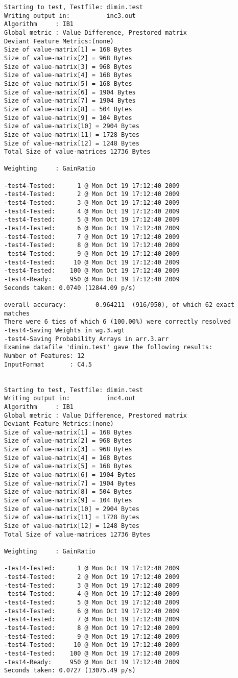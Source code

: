 \documentclass{report}
\begin{document}
\begin{footnotesize}
\begin{verbatim}
Starting to test, Testfile: dimin.test
Writing output in:          inc3.out
Algorithm     : IB1
Global metric : Value Difference, Prestored matrix
Deviant Feature Metrics:(none)
Size of value-matrix[1] = 168 Bytes 
Size of value-matrix[2] = 968 Bytes 
Size of value-matrix[3] = 968 Bytes 
Size of value-matrix[4] = 168 Bytes 
Size of value-matrix[5] = 168 Bytes 
Size of value-matrix[6] = 1904 Bytes 
Size of value-matrix[7] = 1904 Bytes 
Size of value-matrix[8] = 504 Bytes 
Size of value-matrix[9] = 104 Bytes 
Size of value-matrix[10] = 2904 Bytes 
Size of value-matrix[11] = 1728 Bytes 
Size of value-matrix[12] = 1248 Bytes 
Total Size of value-matrices 12736 Bytes 

Weighting     : GainRatio

-test4-Tested:      1 @ Mon Oct 19 17:12:40 2009
-test4-Tested:      2 @ Mon Oct 19 17:12:40 2009
-test4-Tested:      3 @ Mon Oct 19 17:12:40 2009
-test4-Tested:      4 @ Mon Oct 19 17:12:40 2009
-test4-Tested:      5 @ Mon Oct 19 17:12:40 2009
-test4-Tested:      6 @ Mon Oct 19 17:12:40 2009
-test4-Tested:      7 @ Mon Oct 19 17:12:40 2009
-test4-Tested:      8 @ Mon Oct 19 17:12:40 2009
-test4-Tested:      9 @ Mon Oct 19 17:12:40 2009
-test4-Tested:     10 @ Mon Oct 19 17:12:40 2009
-test4-Tested:    100 @ Mon Oct 19 17:12:40 2009
-test4-Ready:     950 @ Mon Oct 19 17:12:40 2009
Seconds taken: 0.0740 (12844.09 p/s)

overall accuracy:        0.964211  (916/950), of which 62 exact matches 
There were 6 ties of which 6 (100.00%) were correctly resolved
-test4-Saving Weights in wg.3.wgt
-test4-Saving Probability Arrays in arr.3.arr
Examine datafile 'dimin.test' gave the following results:
Number of Features: 12
InputFormat       : C4.5


Starting to test, Testfile: dimin.test
Writing output in:          inc4.out
Algorithm     : IB1
Global metric : Value Difference, Prestored matrix
Deviant Feature Metrics:(none)
Size of value-matrix[1] = 168 Bytes 
Size of value-matrix[2] = 968 Bytes 
Size of value-matrix[3] = 968 Bytes 
Size of value-matrix[4] = 168 Bytes 
Size of value-matrix[5] = 168 Bytes 
Size of value-matrix[6] = 1904 Bytes 
Size of value-matrix[7] = 1904 Bytes 
Size of value-matrix[8] = 504 Bytes 
Size of value-matrix[9] = 104 Bytes 
Size of value-matrix[10] = 2904 Bytes 
Size of value-matrix[11] = 1728 Bytes 
Size of value-matrix[12] = 1248 Bytes 
Total Size of value-matrices 12736 Bytes 

Weighting     : GainRatio

-test4-Tested:      1 @ Mon Oct 19 17:12:40 2009
-test4-Tested:      2 @ Mon Oct 19 17:12:40 2009
-test4-Tested:      3 @ Mon Oct 19 17:12:40 2009
-test4-Tested:      4 @ Mon Oct 19 17:12:40 2009
-test4-Tested:      5 @ Mon Oct 19 17:12:40 2009
-test4-Tested:      6 @ Mon Oct 19 17:12:40 2009
-test4-Tested:      7 @ Mon Oct 19 17:12:40 2009
-test4-Tested:      8 @ Mon Oct 19 17:12:40 2009
-test4-Tested:      9 @ Mon Oct 19 17:12:40 2009
-test4-Tested:     10 @ Mon Oct 19 17:12:40 2009
-test4-Tested:    100 @ Mon Oct 19 17:12:40 2009
-test4-Ready:     950 @ Mon Oct 19 17:12:40 2009
Seconds taken: 0.0727 (13075.49 p/s)


\end{verbatim}
\end{footnotesize}
\end{document}
